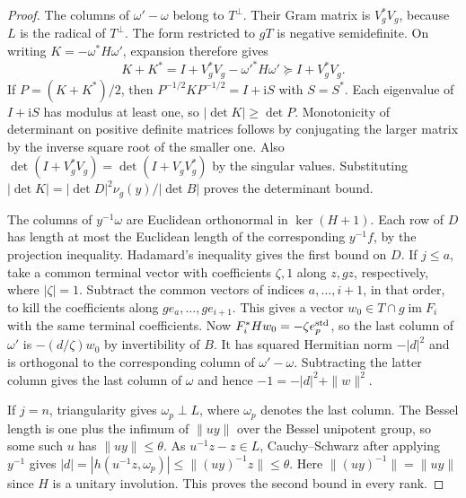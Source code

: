 \documentclass[a4paper,11pt]{article}
\theoremstyle{definition}
\theoremstyle{remark}
\numberwithin{equation}{section}
\begin{document}
\begin{proof}
The columns of \(\omega'-\omega\) belong to \(T^\perp\).
Their Gram matrix is \(V_g^*V_g\), because \(L\) is the
radical of \(T^\perp\). The form restricted to \(gT\) is
negative semidefinite. On writing \(K=-\omega^*H\omega'\),
expansion therefore gives
\[
        K+K^*=I+V_g^*V_g-\omega'^*H\omega'
                                          \succeq I+V_g^*V_g .
\]
If \(P=(K+K^*)/2\), then \(P^{-1/2}KP^{-1/2}=I+\mathrm i S\)
with \(S=S^*\). Each eigenvalue of \(I+\mathrm i S\) has
modulus at least one, so \(|\det K|\ge\det P\).
Monotonicity of determinant on positive definite matrices
follows by conjugating the larger matrix by the inverse
square root of the smaller one. Also
\(\det(I+V_g^*V_g)=\det(I+V_gV_g^*)\) by the singular
values. Substituting
\(|\det K|=|\det D|^2\nu_g(y)/|\det B|\)
proves the determinant bound.

The columns of \(y^{-1}\omega\) are Euclidean orthonormal in
\(\ker(H+1)\). Each row of \(D\) has length at most the
Euclidean length of the corresponding \(y^{-1}f\), by the
projection inequality. Hadamard's inequality gives the first
bound on \(D\). If \(j\le a\), take a common terminal vector
with coefficients \(\zeta,1\) along \(z,gz\), respectively,
where \(|\zeta|=1\). Subtract the common vectors of indices
\(a,\ldots,i+1\), in that order, to kill the coefficients along
\(ge_a,\ldots,ge_{i+1}\). This gives a vector \(w_0\in T\cap
g\operatorname{im}F_i\) with the same terminal coefficients.
Now \(F_i^*Hw_0=-\zeta e_p^{\rm std}\), so the last column
of \(\omega'\) is \(-(d/\zeta)w_0\) by invertibility of \(B\).
It has squared Hermitian norm \(-|d|^2\) and is orthogonal to
the corresponding column of \(\omega'-\omega\). Subtracting
the latter column gives the last column of \(\omega\) and hence
\(-1=-|d|^2+\|w\|^2\).

If \(j=n\), triangularity gives \(\omega_p\perp L\), where
\(\omega_p\) denotes the last column. The Bessel length is one
plus the infimum of \(\|u y\|\) over the Bessel unipotent
group, so some such \(u\) has \(\|u y\|\le\theta\).
As \(u^{-1}z-z\in L\), Cauchy--Schwarz after applying \(y^{-1}\)
gives \(|d|=|h(u^{-1}z,\omega_p)|\le\|(uy)^{-1}z\|
\le\theta\). Here \(\|(uy)^{-1}\|=\|uy\|\) since \(H\) is a
unitary involution. This proves the second bound in every rank.
\end{proof}
\end{document}
